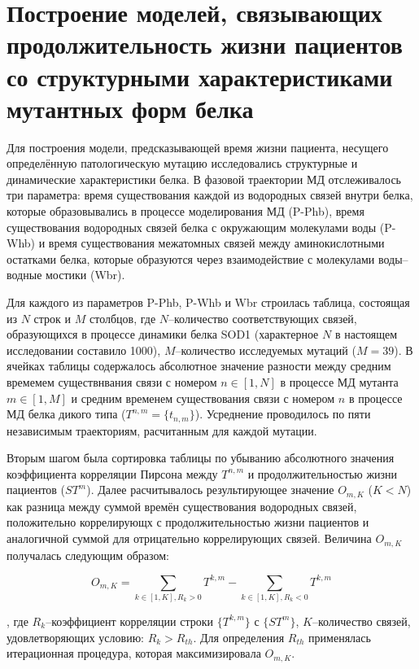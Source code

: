 \section{Построение моделей, связывающих продолжительность жизни пациентов со структурными характеристиками мутантных форм белка} \label{sect_MD_models}

Для построения модели, предсказывающей время жизни пациента, несущего определённую патологическую мутацию исследовались структурные и динамические характеристики белка. В фазовой траектории МД отслеживалось три параметра:  время существования каждой из водородных связей внутри белка, которые образовывались в процессе моделирования МД (P-Phb), время существования водородных связей белка с окружающим молекулами воды (P-Whb) и время существования межатомных связей между аминокислотными остатками белка, которые образуются через взаимодействие с молекулами воды--водные мостики (Wbr).

Для каждого из параметров P-Phb, P-Whb и Wbr строилась таблица, состоящая из $N$ строк и $M$ столбцов, где $N$--количество  соответствующих связей, образующихся в процессе динамики белка SOD1 (характерное $N$ в настоящем исследовании составило 1000), $M$--количество исследуемых мутаций ($M = 39$). В ячейках таблицы содержалось абсолютное значение разности между средним времемем существнвания связи с номером $n\in{\left [ 1,N \right ]}$ в процессе МД мутанта $m\in{\left [ 1,M \right ]}$ и средним временем существования связи с номером $n$ в процессе МД белка дикого типа ($T^{n,m}=\lbrace t_{n,m} \rbrace$). Усреднение проводилось по пяти независимым траекториям, расчитанным для каждой мутации.

Вторым шагом была сортировка таблицы по убыванию абсолютного значения коэффициента корреляции Пирсона между $T^{n,m}$ и продолжительностью жизни пациентов (${ST}^m$). Далее расчитывалось результирующее значение $O_{m, K}$ ($K < N$) как разница между суммой времён существования водородных связей, положительно коррелирующх с продолжительностью жизни пациентов и аналогичной суммой для отрицательно коррелирующих связей. Величина $O_{m, K}$ получалась следующим образом:

\begin{equation}
O_{m, K} = \sum_{k \in \left [ 1,K \right ], R_k > 0}{T^{k, m}}-\sum_{k \in \left [ 1,K \right ], R_k < 0}{T^{k, m}}
\end{equation}

, где $R_k$--коэффициент корреляции строки $\{T^{k,m}\}$ с $\{{ST}^m\}$, $K$--количество связей, удовлетворяющих условию: $R_k > R_{th}$. Для определения $R_{th}$ применялась итерационная процедура, которая максимизировала $O_{m, K}$. 

